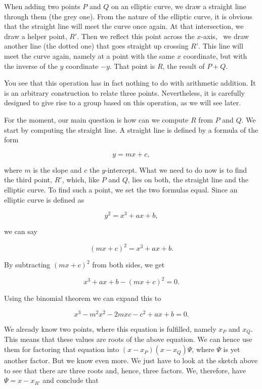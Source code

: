 \documentclass[tikz]{scrreprt}
\begin{document}
When adding two points $P$ and $Q$ on an elliptic curve, 
we draw a straight line through them (the grey one).
From the nature of the elliptic curve, it is obvious
that the straight line will meet the curve once again.
At that intersection, we draw a helper point, $R'$.
Then we reflect this point across the $x$-axis, \ie\
we draw another line (the dotted one) that goes
straight up crossing $R'$. This line will meet the curve
again, namely at a point with the same $x$ coordinate,
but with the inverse of the $y$ coordinate $-y$.
That point is $R$, the result of $P + Q$.

You see that this operation has in fact nothing to do
with arithmetic addition. It is an arbitrary construction
to relate three points.
Nevertheless, it is carefully designed to give rise
to a group based on this operation, as we will see later.

For the moment, our main question is how can we
compute $R$ from $P$ and $Q$. We start by computing
the straight line. A straight line is defined by
a formula of the form

\begin{equation}
y = mx + c,
\end{equation}

where $m$ is the slope and $c$ the $y$-intercept.
What we need to do now is to find the third point,
$R'$, which, like $P$ and $Q$, lies on both,
the straight line and the elliptic curve.
To find such a point, we set the two formulas
equal. Since an elliptic curve is defined as

\begin{equation}  
y^2 = x^3 + ax + b, 
\end{equation}  

we can say

\begin{equation}  
(mx + c)^2 = x^3 + ax + b.
\end{equation}

By subtracting $(mx+c)^2$ from both sides, we get

\begin{equation}  
x^3 + ax + b - (mx + c)^2 = 0.
\end{equation}

Using the binomial theorem 
we can expand this to

\begin{equation}  
x^3 - m^2x^2 - 2mxc - c^2 + ax + b = 0.
\end{equation}

We already know two points, where this equation is fulfilled,
namely $x_P$ and $x_Q$. This means that these values
are roots of the above equation. We can hence use them for
factoring that equation into $(x-x_P)(x-x_Q)\Psi$,
where $\Psi$ is yet another factor. But we know even more.
We just have to look at the sketch above to see that there
are three roots and, hence, three factors. 
We, therefore, have $\Psi = x - x_{R'}$ and conclude that
\end{document}
